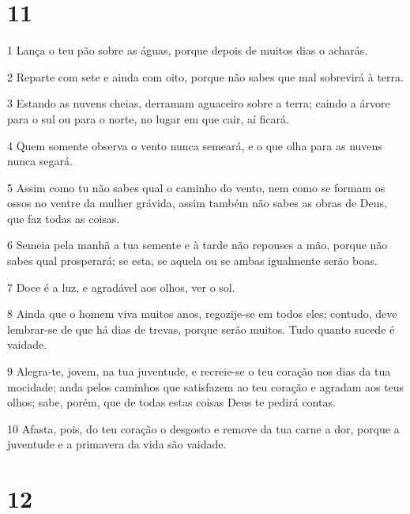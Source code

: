 \chapter{11}

\par 1 Lança o teu pão sobre as águas, porque depois de muitos dias o acharás.
\par 2 Reparte com sete e ainda com oito, porque não sabes que mal sobrevirá à terra.
\par 3 Estando as nuvens cheias, derramam aguaceiro sobre a terra; caindo a árvore para o sul ou para o norte, no lugar em que cair, aí ficará.
\par 4 Quem somente observa o vento nunca semeará, e o que olha para as nuvens nunca segará.
\par 5 Assim como tu não sabes qual o caminho do vento, nem como se formam os ossos no ventre da mulher grávida, assim também não sabes as obras de Deus, que faz todas as coisas.
\par 6 Semeia pela manhã a tua semente e à tarde não repouses a mão, porque não sabes qual prosperará; se esta, se aquela ou se ambas igualmente serão boas.
\par 7 Doce é a luz, e agradável aos olhos, ver o sol.
\par 8 Ainda que o homem viva muitos anos, regozije-se em todos eles; contudo, deve lembrar-se de que há dias de trevas, porque serão muitos. Tudo quanto sucede é vaidade.
\par 9 Alegra-te, jovem, na tua juventude, e recreie-se o teu coração nos dias da tua mocidade; anda pelos caminhos que satisfazem ao teu coração e agradam aos teus olhos; sabe, porém, que de todas estas coisas Deus te pedirá contas.
\par 10 Afasta, pois, do teu coração o desgosto e remove da tua carne a dor, porque a juventude e a primavera da vida são vaidade.

\chapter{12}

